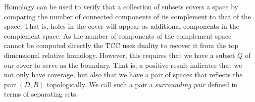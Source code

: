 

Homology can be used to verify that a collection of subsets covers a space by comparing the number of connected components of its complement to that of the space.
That is, holes in the cover will appear as additional components in the complement space.
As the number of components of the complement space cannot be computed directly the TCC uses duality to recover it from the top dimensional relative homology.
However, this requires that we have a subset $Q$ of our cover to serve as the boundary.
That is, a positive result indicates that we not only have coverage, but also that we have a pair of spaces that reflects the pair $(D, B)$ topologically.
We call such a pair a \emph{surrounding pair} defined in terms of separating sets.

